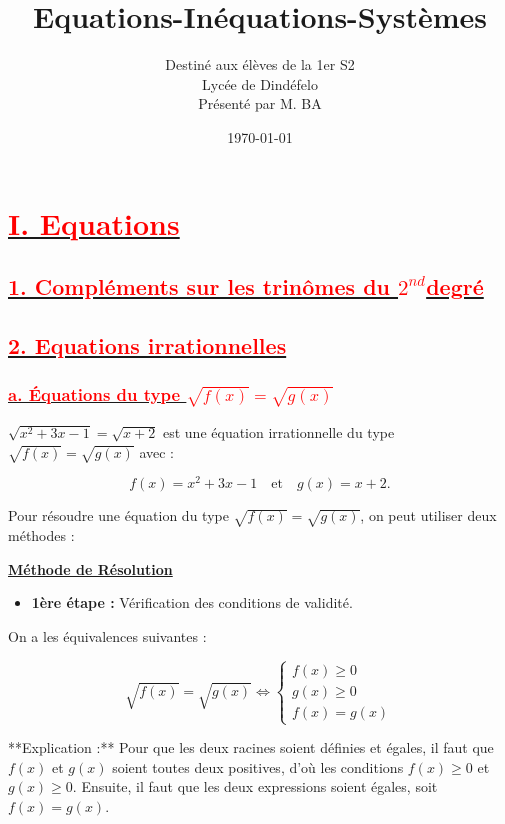 \documentclass[12pt]{article}
\author{Destiné aux élèves de la 1er S2\\Lycée de Dindéfelo\\Présenté par M. BA}
\title{\textbf{Equations-Inéquations-Systèmes}}
\date{\today}
\newcounter{solution}
\begin{document}
\maketitle
\newpage
\section*{\underline{\textbf{\textcolor{red}{I. Equations}}}}
\subsection*{\underline{\textbf{\textcolor{red}{1. Compléments sur les trinômes du \( 2^{nd} \)degré}}}}
\subsection*{\underline{\textbf{\textcolor{red}{2. Equations irrationnelles}}}}
\subsubsection*{\underline{\textbf{\textcolor{red}{a. Équations du type \( \sqrt{f(x)} = \sqrt{g(x)} \)}}}}

\( \sqrt{x^{2}+3x-1} = \sqrt{x+2} \) est une équation irrationnelle du type \( \sqrt{f(x)} = \sqrt{g(x)} \) avec :

\[ f(x) = x^{2}+3x-1 \quad \text{et} \quad g(x) = x+2. \]

Pour résoudre une équation du type \( \sqrt{f(x)} = \sqrt{g(x)} \), on peut utiliser deux méthodes :

\underline{\textbf{Méthode de Résolution}}

\begin{itemize}
    \item \textbf{1ère étape :} Vérification des conditions de validité.
\end{itemize}

On a les équivalences suivantes :

\[
\sqrt{ f(x)} = \sqrt{ g(x)} \Leftrightarrow \begin{cases}
f(x) \geq 0 \\
g(x) \geq 0 \\
f(x) = g(x)
\end{cases}
\]

**Explication :** Pour que les deux racines soient définies et égales, il faut que \( f(x) \) et \( g(x) \) soient toutes deux positives, d'où les conditions \( f(x) \geq 0 \) et \( g(x) \geq 0 \). Ensuite, il faut que les deux expressions soient égales, soit \( f(x) = g(x) \).
\end{document}
